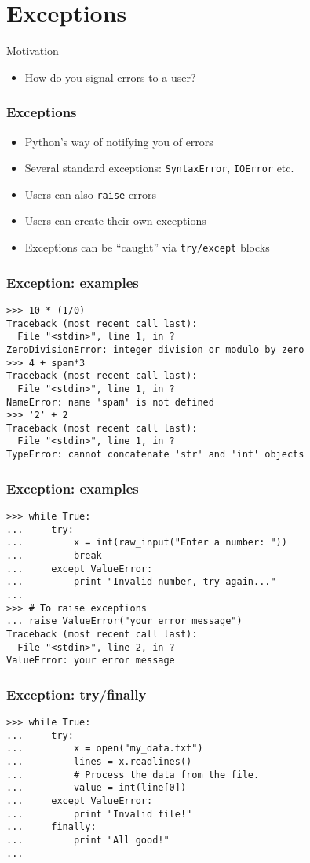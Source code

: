 \documentclass[12pt,presentation]{beamer}
\begin{document}
\section{Exceptions}

\begin{frame}{Motivation}
    \begin{itemize}
        \item How do you signal errors to a user?
    \end{itemize}
\end{frame}

\begin{frame}
  \frametitle{Exceptions}
  \begin{itemize}
  \item Python's way of notifying you of errors
  \item Several standard exceptions: \texttt{SyntaxError}, \texttt{IOError}
    etc.
  \item Users can also \texttt{raise} errors
  \item Users can create their own exceptions
  \item Exceptions can be ``caught'' via \texttt{try/except} blocks
  \end{itemize}
\end{frame}

\begin{frame}[fragile]
  \frametitle{Exception: examples}
\begin{lstlisting}
>>> 10 * (1/0)
Traceback (most recent call last):
  File "<stdin>", line 1, in ?
ZeroDivisionError: integer division or modulo by zero
>>> 4 + spam*3
Traceback (most recent call last):
  File "<stdin>", line 1, in ?
NameError: name 'spam' is not defined
>>> '2' + 2
Traceback (most recent call last):
  File "<stdin>", line 1, in ?
TypeError: cannot concatenate 'str' and 'int' objects
\end{lstlisting}
\end{frame}

\begin{frame}[fragile]
  \frametitle{Exception: examples}
\begin{lstlisting}
>>> while True:
...     try:
...         x = int(raw_input("Enter a number: "))
...         break
...     except ValueError:
...         print "Invalid number, try again..."
...
>>> # To raise exceptions
... raise ValueError("your error message")
Traceback (most recent call last):
  File "<stdin>", line 2, in ?
ValueError: your error message
\end{lstlisting}
\end{frame}

\begin{frame}[fragile]
  \frametitle{Exception: try/finally}
\begin{lstlisting}
>>> while True:
...     try:
...         x = open("my_data.txt")
...         lines = x.readlines()
...         # Process the data from the file.
...         value = int(line[0])
...     except ValueError:
...         print "Invalid file!"
...     finally:
...         print "All good!"
...
\end{lstlisting}
\end{frame}
\end{document}
